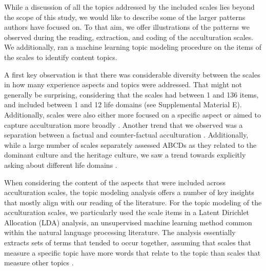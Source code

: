 \documentclass[man, 12pt, a4paper, mask]{apa7}
\begin{document}
While a discussion of all the topics addressed by the included scales
lies beyond the scope of this study, we would like to describe some of
the larger patterns authors have focused on. To that aim, we offer
illustrations of the patterns we observed during the reading,
extraction, and coding of the acculturation scales. We additionally, ran
a machine learning topic modeling procedure on the items of the scales
to identify content topics.

A first key observation is that there was considerable diversity between
the scales in how many experience aspects and topics were addressed.
That might not generally be surprising, considering that the scales had
between 1 and 136 items, and included between 1 and 12 life domains (see
Supplemental Material E). Additionally, scales were also either more
focused on a specific aspect
\citep[e.g., `Asian Value Scale';][]{Kim1999, Kim2004a} or aimed to
capture acculturation more broadly
\citep[e.g., `Asian American Multidimensional Acculturation Scale'][]{GimChung2004}.
Another trend that we observed was a separation between a factual and
counter-factual acculturation
\citep[e.g., real vs. ideal,][]{Navas2005, Navas2007, BenetMartinez2006}.
Additionally, while a large number of scales separately assessed ABCDs
as they related to the dominant culture and the heritage culture, we saw
a trend towards explicitly asking about different life domains
\citep[e.g., family, work, media;][also see Supplemental Material E]{Kim2010a, Arends-Toth2007, Mancini2014}.

When considering the content of the aspects that were included across
acculturation scales, the topic modeling analysis offers a number of key
insights that mostly align with our reading of the literature. For the
topic modeling of the acculturation scales, we particularly used the
scale items in a Latent Dirichlet Allocation (LDA) analysis, an
unsupervised machine learning method common within the natural language
processing literature. The analysis essentially extracts sets of terms
that tended to occur together, assuming that scales that measure a
specific topic have more words that relate to the topic than scales that
measure other topics
\citep[we followed the procedures outlined by][for a full methodological detail see Supplemental Material C]{Schweinberger2022}.
\end{document}
